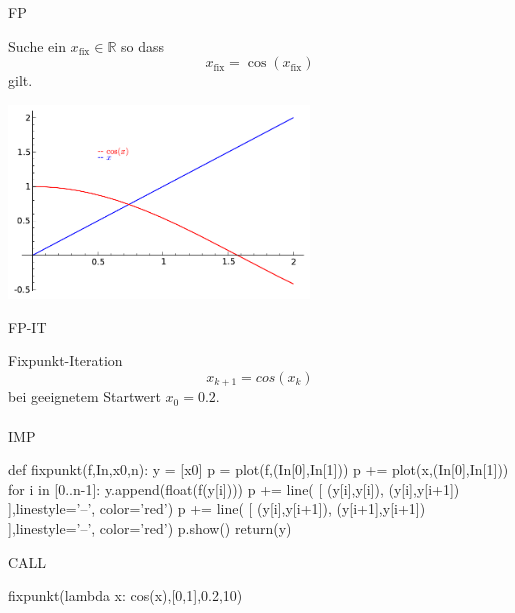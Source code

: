 \documentclass[fontsize=12pt,paper=a4,twoside,bibtotoc,idxtotoc,
liststotoc,pagesize,BCOR1.2cm,DIV15,chapterprefix,pagesize=pdftex]{scrbook}
\theoremstyle{plain}
\theoremstyle{definition}
\theoremstyle{remark}
\begin{document}
FP

Suche ein $x_{\mathrm{fix}} \in \mathbb{R}$ so dass
\[ x_{\mathrm{fix}} = \cos (x_{\mathrm{fix}}) \]
gilt.
\begin{center}
\includegraphics[width=8cm]{iter1.pdf}
\end{center}

FP-IT

Fixpunkt-Iteration 
\[ x_{k+1}=cos(x_k) \]
bei geeignetem Startwert $x_0 = 0.2$.  \\
\\

IMP

\begin{small}
\begin{sagein}
def fixpunkt(f,In,x0,n):
    y = [x0]
    p = plot(f,(In[0],In[1]))
    p += plot(x,(In[0],In[1]))
    for i in [0..n-1]:
        y.append(float(f(y[i])))
        p += line( [ (y[i],y[i]), (y[i],y[i+1]) ],linestyle='--', color='red')
        p += line( [ (y[i],y[i+1]), (y[i+1],y[i+1]) ],linestyle='--', color='red')
    p.show()
    return(y)
\end{sagein}
\end{small}

CALL

\begin{sagein}
fixpunkt(lambda x: cos(x),[0,1],0.2,10)
\end{sagein}
\begin{sage}
[0.200000000000000, 0.98006657784124163, 0.55696725280964243, 0.84886216565827077, 0.66083755111661502, 0.78947843776686832, 0.70421571334199318, 0.76211956176066087, 0.72337417210557109, 0.74957657633149311, 0.73197742525819132]
\end{sage}
\end{document}
